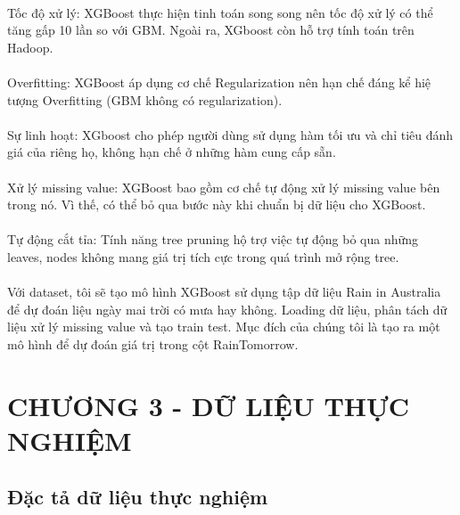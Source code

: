 \documentclass{article}
\begin{document}
\paragraph{}Tốc độ xử lý: XGBoost thực hiện tinh toán song song nên tốc độ xử lý có thể tăng gấp 10 lần so với GBM. Ngoài ra, XGboost còn hỗ trợ tính toán trên Hadoop.
\paragraph{}Overfitting: XGBoost áp dụng cơ chế Regularization nên hạn chế đáng kể hiệ tượng Overfitting (GBM không có regularization).
\paragraph{}Sự linh hoạt: XGboost cho phép người dùng sử dụng hàm tối ưu và chỉ tiêu đánh giá của riêng họ, không hạn chế ở những hàm cung cấp sẵn.
\paragraph{}Xử lý missing value: XGBoost bao gồm cơ chế tự động xử lý missing value bên trong nó. Vì thế, có thể bỏ qua bước này khi chuẩn bị dữ liệu cho XGBoost.
\paragraph{}Tự động cắt tỉa: Tính năng tree pruning hộ trợ việc tự động bỏ qua những leaves, nodes không mang giá trị tích cực trong quá trình mở rộng tree.
\paragraph{}Với dataset, tôi sẽ tạo mô hình XGBoost sử dụng tập dữ liệu Rain in Australia để dự đoán liệu ngày mai trời có mưa hay không. Loading dữ liệu, phân tách dữ liệu xử lý missing value và tạo train test. Mục đích của chúng tôi là tạo ra một mô hình để dự đoán giá trị trong cột RainTomorrow.
\pagebreak
\section*{CHƯƠNG 3 - DỮ LIỆU THỰC NGHIỆM}
\setcounter{section}{3}
\setcounter{subsection}{0}
\subsection{Đặc tả dữ liệu thực nghiệm}
\end{document}
